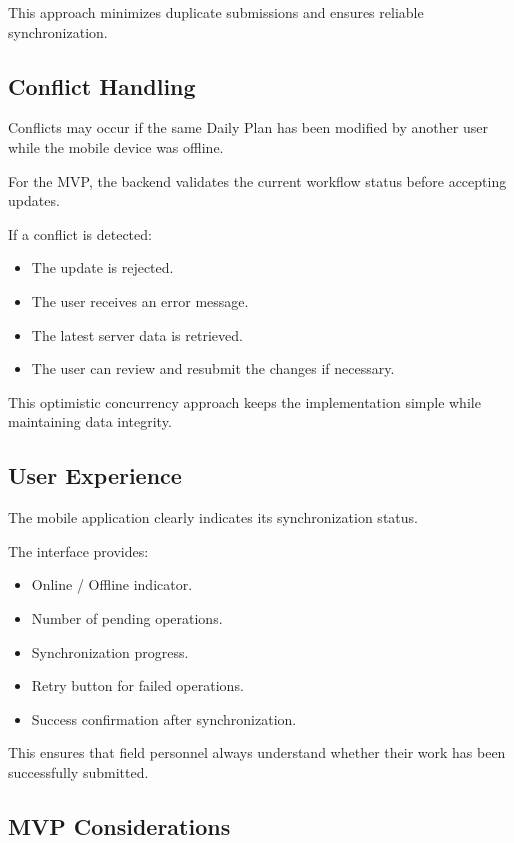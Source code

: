 \documentclass[11pt]{article}
\begin{document}
This approach minimizes duplicate submissions and ensures reliable
synchronization.

\subsection{Conflict Handling}

Conflicts may occur if the same Daily Plan has been modified by another user
while the mobile device was offline.

For the MVP, the backend validates the current workflow status before accepting
updates.

If a conflict is detected:

\begin{itemize}
    \item The update is rejected.
    \item The user receives an error message.
    \item The latest server data is retrieved.
    \item The user can review and resubmit the changes if necessary.
\end{itemize}

This optimistic concurrency approach keeps the implementation simple while
maintaining data integrity.

\subsection{User Experience}

The mobile application clearly indicates its synchronization status.

The interface provides:

\begin{itemize}
    \item Online / Offline indicator.
    \item Number of pending operations.
    \item Synchronization progress.
    \item Retry button for failed operations.
    \item Success confirmation after synchronization.
\end{itemize}

This ensures that field personnel always understand whether their work has been
successfully submitted.

\subsection{MVP Considerations}
\end{document}
